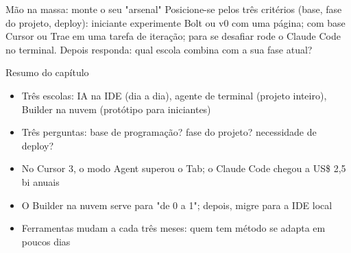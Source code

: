\begin{tcbpractice}{Mão na massa: monte o seu "arsenal"}
Posicione-se pelos três critérios (base, fase do projeto, deploy): iniciante experimente Bolt ou v0 com uma página; com base Cursor ou Trae em uma tarefa de iteração; para se desafiar rode o Claude Code no terminal. Depois responda: qual escola combina com a sua fase atual?

\end{tcbpractice}

\begin{tcbsummary}{Resumo do capítulo}
\begin{itemize}
  \item Três escolas: IA na IDE (dia a dia), agente de terminal (projeto inteiro), Builder na nuvem (protótipo para iniciantes)
  \item Três perguntas: base de programação? fase do projeto? necessidade de deploy?
  \item No Cursor 3, o modo Agent superou o Tab; o Claude Code chegou a US\$ 2,5 bi anuais
  \item O Builder na nuvem serve para "de 0 a 1"; depois, migre para a IDE local
  \item Ferramentas mudam a cada três meses: quem tem método se adapta em poucos dias
\end{itemize}

\end{tcbsummary}
